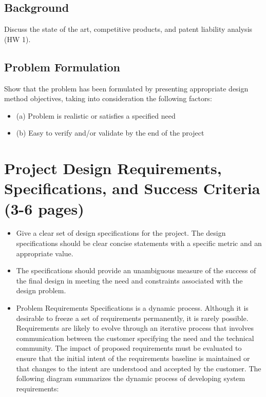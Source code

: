 \documentclass[12pt]{article}
\begin{document}
\subsection{Background}
Discuss the state of the art, competitive products, and patent liability analysis (HW 1).

\subsection{Problem Formulation}
Show that the problem has been formulated by presenting appropriate design method objectives, taking into consideration the following factors:
\begin{itemize}[noitemsep]
    \item (a) Problem is realistic or satisfies a specified need
    \item (b) Easy to verify and/or validate by the end of the project
\end{itemize}

\section{Project Design Requirements, Specifications, and Success Criteria (3-6 pages)}
\begin{itemize}[noitemsep]
    \item Give a clear set of design specifications for the project. The design specifications should be clear concise statements with a specific metric and an appropriate value.
    \item The specifications should provide an unambiguous measure of the success of the final design in meeting the need and constraints associated with the design problem.
    \item Problem Requirements Specifications is a dynamic process. Although it is desirable to freeze a set of requirements permanently, it is rarely possible. Requirements are likely to evolve through an iterative process that involves communication between the customer specifying the need and the technical community. The impact of proposed requirements must be evaluated to ensure that the initial intent of the requirements baseline is maintained or that changes to the intent are understood and accepted by the customer. The following diagram summarizes the dynamic process of developing system requirements:
\end{itemize}
\end{document}
